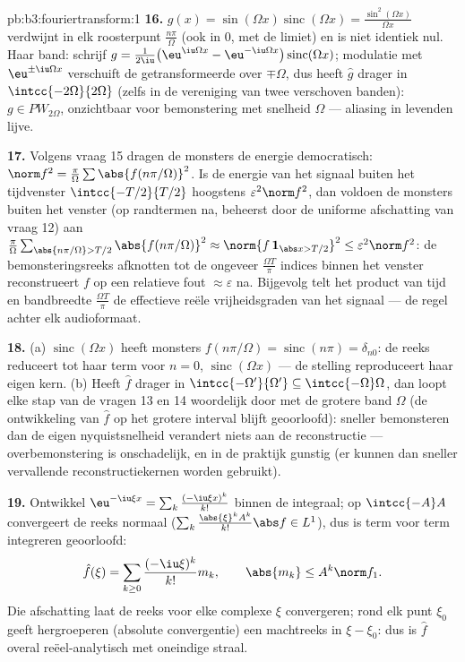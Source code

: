 \begin{solution}{pb:b3:fouriertransform:1}
\textbf{16.} $g(x) = \sin(\Omega x)\operatorname{sinc} (\Omega x)
= \frac{\sin^2(\Omega x)}{\Omega x}$ verdwijnt in elk roosterpunt
$\frac{n\pi}\Omega$ (ook in $0$, met de limiet) en is niet
identiek nul. Haar band: schrijf $g = \frac1{2\iu}\bigl(\eu^{\iu
\Omega x} - \eu^{-\iu\Omega x}\bigr)\operatorname{sinc}(\Omega
x)$; modulatie met $\eu^{\pm\iu\Omega x}$ verschuift de
getransformeerde over $\mp\Omega$, dus heeft $\hat g$ drager in
$\intcc{-2\Omega}{2\Omega}$ (zelfs in de vereniging van twee
verschoven banden): $g \in PW_{2\Omega}$, onzichtbaar voor
bemonstering met snelheid $\Omega$ --- aliasing in levenden
lijve.

\textbf{17.} Volgens vraag 15 dragen de monsters de energie
democratisch: $\norm f^2 = \frac\pi\Omega\sum
\abs{f(n\pi/\Omega)}^2$. Is de energie van het signaal buiten het
tijdvenster $\intcc{-T/2}{T/2}$ hoogstens $\varepsilon^2\norm
f^2$, dan voldoen de monsters buiten het venster (op randtermen
na, beheerst door de uniforme afschatting van vraag 12) aan
$\frac\pi\Omega\sum_{\abs{n\pi/\Omega} > T/2}
\abs{f(n\pi/\Omega)}^2 \approx \norm{f\,\mathbf 1_{\abs x >
T/2}}^2 \leq \varepsilon^2\norm f^2$: de bemonsteringsreeks
afknotten tot de ongeveer $\frac{\Omega T}\pi$ indices binnen het
venster reconstrueert $f$ op een relatieve fout $\approx
\varepsilon$ na. Bijgevolg telt het product van tijd en bandbreedte
$\frac{\Omega T}{\pi}$ de effectieve reële vrijheidsgraden van
het signaal --- de regel achter elk audioformaat.

\textbf{18.} (a) $\operatorname{sinc}(\Omega x)$ heeft monsters
$f(n\pi/\Omega) = \operatorname{sinc}(n\pi) = \delta_{n0}$: de
reeks reduceert tot haar term voor $n = 0$,
$\operatorname{sinc}(\Omega x)$ --- de stelling reproduceert haar
eigen kern. (b) Heeft $\hat f$ drager in
$\intcc{-\Omega'}{\Omega'} \subseteq \intcc{-\Omega}\Omega$, dan
loopt elke stap van de vragen 13 en 14 woordelijk door met de
grotere band $\Omega$ (de ontwikkeling van $\hat f$ op het
grotere interval blijft geoorloofd): sneller bemonsteren dan de
eigen nyquistsnelheid verandert niets aan de reconstructie ---
overbemonstering is onschadelijk, en in de praktijk gunstig (er
kunnen dan sneller vervallende reconstructiekernen worden
gebruikt).

\textbf{19.} Ontwikkel $\eu^{-\iu\xi x} = \sum_k\frac{(-\iu\xi
x)^k}{k!}$ binnen de integraal; op $\intcc{-A}A$ convergeert de
reeks normaal ($\sum_k\frac{\abs{\xi}^kA^k}{k!}\abs f \in L^1$),
dus is term voor term integreren geoorloofd:
\[
\hat f(\xi) = \sum_{k\geq0}\frac{(-\iu\xi)^k}{k!}m_k,
\qquad \abs{m_k} \leq A^k\norm f_1 .
\]
Die afschatting laat de reeks voor elke complexe $\xi$
convergeren; rond elk punt $\xi_0$ geeft hergroeperen (absolute
convergentie) een machtreeks in $\xi - \xi_0$: dus is $\hat f$
overal reëel-analytisch met oneindige straal.


\end{solution}
